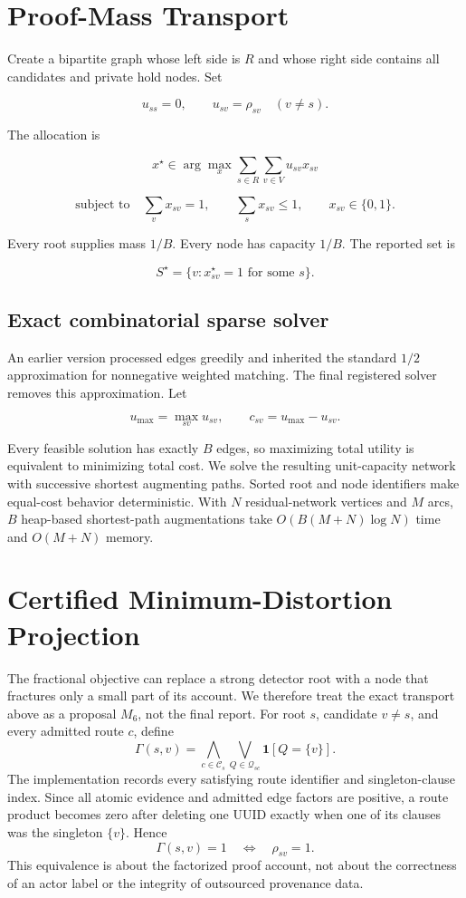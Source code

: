 \documentclass[runningheads]{llncs}
\begin{document}
\section{Proof-Mass Transport}

Create a bipartite graph whose left side is \(R\) and whose right side contains all candidates and private hold nodes. Set

\[
u_{ss}=0,\qquad u_{sv}=\rho_{sv}\quad(v\ne s).
\]

The allocation is

\[
x^\star\in\arg\max_x
\sum_{s\in R}\sum_{v\in V}u_{sv}x_{sv}
\]

\[
\text{subject to}\quad
\sum_vx_{sv}=1,\qquad
\sum_sx_{sv}\le1,\qquad
x_{sv}\in\{0,1\}.
\]

Every root supplies mass \(1/B\). Every node has capacity \(1/B\). The reported set is

\[
S^\star=\{v:x^\star_{sv}=1\text{ for some }s\}.
\]

\subsection{Exact combinatorial sparse solver}

An earlier version processed edges greedily and inherited the standard \(1/2\) approximation for nonnegative weighted matching. The final registered solver removes this approximation. Let

\[
u_{\max}=\max_{sv}u_{sv},
\qquad
c_{sv}=u_{\max}-u_{sv}.
\]

Every feasible solution has exactly \(B\) edges, so maximizing total utility is equivalent to minimizing total cost. We solve the resulting unit-capacity network with successive shortest augmenting paths. Sorted root and node identifiers make equal-cost behavior deterministic.
With \(N\) residual-network vertices and \(M\) arcs, \(B\) heap-based shortest-path augmentations take \(O(B(M+N)\log N)\) time and \(O(M+N)\) memory.

\section{Certified Minimum-Distortion Projection}

The fractional objective can replace a strong detector root with a node that fractures only a small part of its account. We therefore treat the exact transport above as a proposal \(M_6\), not the final report. For root \(s\), candidate \(v\ne s\), and every admitted route \(c\), define
\[
\Gamma(s,v)=
\bigwedge_{c\in\mathcal C_s}
\bigvee_{Q\in\mathcal Q_{sc}}
\mathbf 1[Q=\{v\}].
\]
The implementation records every satisfying route identifier and singleton-clause index. Since all atomic evidence and admitted edge factors are positive, a route product becomes zero after deleting one UUID exactly when one of its clauses was the singleton \(\{v\}\). Hence
\[
\Gamma(s,v)=1\quad\Longleftrightarrow\quad \rho_{sv}=1.
\]
This equivalence is about the factorized proof account, not about the correctness of an actor label or the integrity of outsourced provenance data.
\end{document}

